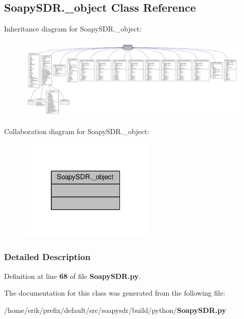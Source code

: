 \subsection{Soapy\+S\+D\+R.\+\_\+object Class Reference}
\label{classSoapySDR_1_1__object}


Inheritance diagram for Soapy\+S\+D\+R.\+\_\+object\+:
\nopagebreak
\begin{figure}[H]
\begin{center}
\leavevmode
\includegraphics[width=350pt]{dc/d07/classSoapySDR_1_1__object__inherit__graph}
\end{center}
\end{figure}


Collaboration diagram for Soapy\+S\+D\+R.\+\_\+object\+:
\nopagebreak
\begin{figure}[H]
\begin{center}
\leavevmode
\includegraphics[width=181pt]{dd/d17/classSoapySDR_1_1__object__coll__graph}
\end{center}
\end{figure}


\subsubsection{Detailed Description}


Definition at line {\bf 68} of file {\bf Soapy\+S\+D\+R.\+py}.



The documentation for this class was generated from the following file\+:\begin{DoxyCompactItemize}
\item 
/home/erik/prefix/default/src/soapysdr/build/python/{\bf Soapy\+S\+D\+R.\+py}\end{DoxyCompactItemize}
